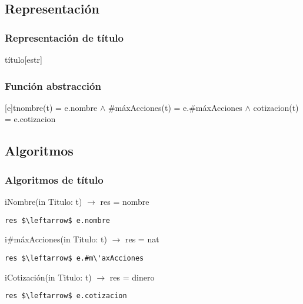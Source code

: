 \subsection{Representaci\'on}
\subsubsection{Representaci\'on de t\'itulo}
\begin{Estructura}{t\'itulo}[estr]
    \begin{Tupla}[estr]
    \end{Tupla}
\end{Estructura}



\subsubsection{Funci\'on abstracci\'on}
[e]{t}{nombre(t) = e.nombre $\land$ #m\'axAcciones(t) = e.#m\'axAcciones $\land$ cotizacion(t) = e.cotizacion} %

  \subsection{Algoritmos}
\subsubsection{Algoritmos de t\'itulo}

iNombre(in Titulo: t) $\rightarrow$ res = nombre
\begin{lstlisting}[mathescape]
 res $\leftarrow$ e.nombre
\end{lstlisting}

i#m\'axAcciones(in Titulo: t) $\rightarrow$ res = nat
\begin{lstlisting}[mathescape]
 res $\leftarrow$ e.#m\'axAcciones
\end{lstlisting}

iCotización(in Titulo: t) $\rightarrow$ res = dinero
\begin{lstlisting}[mathescape]
 res $\leftarrow$ e.cotizacion
\end{lstlisting}


